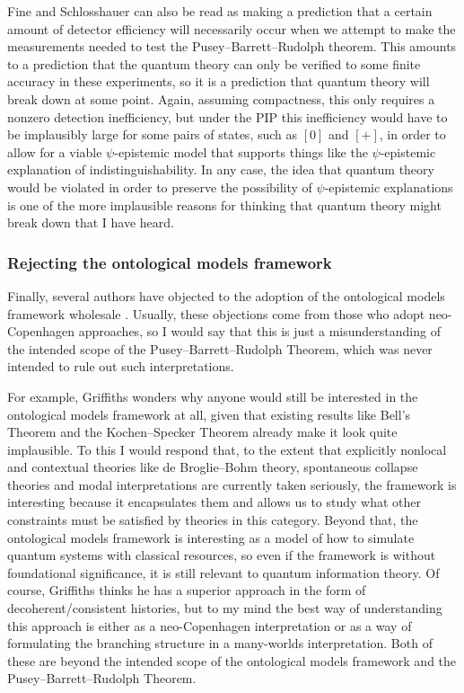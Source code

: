 \documentclass[DIV=calc,fontsize=12pt]{scrartcl} %
\theoremstyle{definition}
\theoremstyle{plain}
\newcommand{\Proj}[1]{\ensuremath{\left [ #1 \right ]}}
\begin{document}
Fine and Schlosshauer can also be read as making a prediction that a
certain amount of detector efficiency will necessarily occur when we
attempt to make the measurements needed to test the Pusey--Barrett--Rudolph theorem.  This
amounts to a prediction that the quantum theory can only be verified
to some finite accuracy in these experiments, so it is a prediction
that quantum theory will break down at some point.  Again, assuming
compactness, this only requires a nonzero detection inefficiency, but
under the PIP this inefficiency would have to be implausibly large for
some pairs of states, such as $\Proj{0}$ and $\Proj{+}$, in order to
allow for a viable $\psi$-epistemic model that supports things like
the $\psi$-epistemic explanation of indistinguishability.  In any
case, the idea that quantum theory would be violated in order to
preserve the possibility of $\psi$-epistemic explanations is one of
the more implausible reasons for thinking that quantum theory might
break down that I have heard.


\subsubsection{Rejecting the ontological models framework}

\label{Crit:Copenhagen}

Finally, several authors have objected to the adoption of the
ontological models framework wholesale \cite{Hofmann2011, Motl2011,
Griffiths2012}.  Usually, these objections come from those who adopt
neo-Copenhagen approaches, so I would say that this is just a
misunderstanding of the intended scope of the Pusey--Barrett--Rudolph Theorem, which was
never intended to rule out such interpretations.

For example, Griffiths \cite{Griffiths2012} wonders why anyone would
still be interested in the ontological models framework at all, given
that existing results like Bell's Theorem and the Kochen--Specker
Theorem already make it look quite implausible.  To this I would
respond that, to the extent that explicitly nonlocal and contextual
theories like de Broglie--Bohm theory, spontaneous collapse theories
and modal interpretations are currently taken seriously, the framework
is interesting because it encapsulates them and allows us to study
what other constraints must be satisfied by theories in this category.
Beyond that, the ontological models framework is interesting as a
model of how to simulate quantum systems with classical resources, so
even if the framework is without foundational significance, it is
still relevant to quantum information theory.  Of course, Griffiths
thinks he has a superior approach in the form of decoherent/consistent
histories, but to my mind the best way of understanding this approach
is either as a neo-Copenhagen interpretation or as a way of
formulating the branching structure in a many-worlds interpretation.
Both of these are beyond the intended scope of the ontological models
framework and the Pusey--Barrett--Rudolph Theorem.
\end{document}
